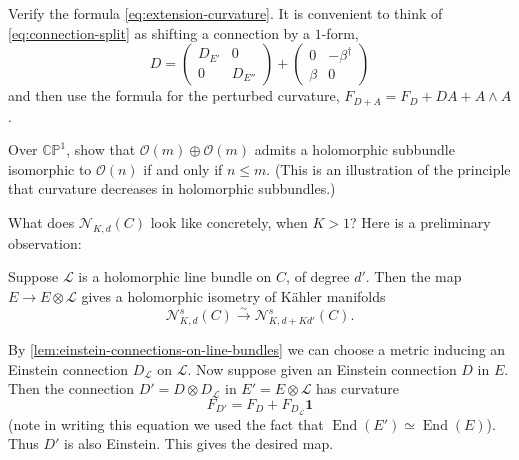 \documentclass[12pt,letterpaper,reqno]{article}
\numberwithin{equation}{section}
\newcommand{\cL}{\ensuremath{\mathcal L}}
\newcommand{\cN}{\ensuremath{\mathcal N}}
\newcommand{\cO}{\ensuremath{\mathcal O}}
\newcommand{\C}{\ensuremath{\mathbb C}}
\newcommand{\PP}{\ensuremath{\mathbb P}}
\newcommand{\kahler}{K\"ahler\xspace}
\newcommand\bid{{\mathbf 1}}
\newcommand{\simarrow}{\xrightarrow\sim}
\DeclareMathOperator{\End}{End}
\begin{document}
\begin{exercise} Verify the formula \eqref{eq:extension-curvature}.
It is convenient to think of \eqref{eq:connection-split} as shifting
a connection by a $1$-form,
\begin{equation}
  D = \begin{pmatrix} D_{E'} & 0 \\ 0 & D_{E''} \end{pmatrix} + \begin{pmatrix} 0 & - \beta^\dagger \\ \beta & 0 \end{pmatrix}
\end{equation}
and then use the formula for the perturbed
curvature, $F_{D + A} = F_D + DA + A \wedge A$.
\end{exercise}

\begin{exercise} Over $\C\PP^1$, show that $\cO(m) \oplus \cO(m)$
admits a holomorphic subbundle isomorphic to $\cO(n)$ if and only if
$n \le m$.
(This is an illustration of the principle that curvature
decreases in holomorphic subbundles.)
\end{exercise}

What does $\cN_{K,d}(C)$ look like concretely, when $K>1$? Here is a 
preliminary observation:

\begin{prop} \label{prop:tensor-line-is-isometry}
Suppose $\cL$ is a holomorphic line bundle on $C$, of degree $d'$.
Then the map $E \to E \otimes \cL$ gives a holomorphic 
isometry of \kahler manifolds
\begin{equation}
\cN^s_{K,d}(C) \simarrow \cN^s_{K,d+Kd'}(C).
\end{equation}
\end{prop}
\begin{pf}
By \autoref{lem:einstein-connections-on-line-bundles} we can choose 
a metric inducing an Einstein connection $D_\cL$ on $\cL$. Now 
suppose given an Einstein connection $D$ in $E$. Then the connection
$D' = D \otimes D_\cL$ in $E' = E \otimes \cL$ has curvature 
\begin{equation} \label{eq:additivity-of-curvature}
 F_{D'} = F_D + F_{D_\cL} \bid
\end{equation}
(note in writing this equation we used
the fact that $\End(E') \simeq \End(E)$).
Thus $D'$ is also Einstein. This gives the desired map.
\end{pf}
\end{document}
